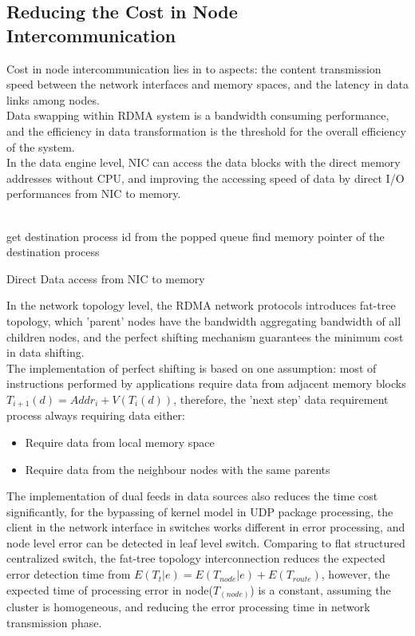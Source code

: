 \documentclass[11pt,openright,a4paper]{report}
\begin{document}
\subsection{Reducing the Cost in Node Intercommunication}
Cost in node intercommunication lies in to aspects: the content transmission speed between the network interfaces and memory spaces, and the latency in data links among nodes\cite{arimilli2010percs}.\\
Data swapping within RDMA system is a bandwidth consuming performance, and the efficiency in data transformation is the threshold for the overall efficiency of the system. \\
In the data engine level, NIC can access the data blocks with the direct memory addresses without CPU, and improving the accessing speed of data by direct I/O performances from NIC to memory. \\
\\
\begin{algorithm}[H]
	get destination process id from the popped queue\;
	find memory pointer of the destination process\;
\caption{Direct Data access from NIC to memory}
\end{algorithm}
In the network topology level, the RDMA network protocols introduces fat-tree topology, which 'parent' nodes have the bandwidth aggregating bandwidth of all children nodes, and the perfect shifting mechanism guarantees the minimum cost in data shifting.\\
The implementation of perfect shifting is based on one assumption: most of instructions performed by applications require data from adjacent memory blocks $T_{i+1}(d)=Addr_{i}+V(T_{i}(d))$, therefore, the 'next step' data requirement process always requiring data either:
\begin{itemize}
	\item Require data from local memory space
    \item Require data from the neighbour nodes with the same parents
\end{itemize}
The implementation of dual feeds in data sources also reduces the time cost significantly, for the bypassing of kernel model in UDP package processing, the client in the network interface in switches works different in error processing, and node level error can be detected in leaf level switch\cite{gu2009low}. Comparing to flat structured centralized switch, the fat-tree topology interconnection reduces the expected error detection time from $E(T_{t}|e)=E(T_{node}|e)+E(T_{route})$, however, the expected time of processing error in node($T_(node)$) is a constant, assuming the cluster is homogeneous, and reducing the error processing time in network transmission phase.\\
\end{document}
